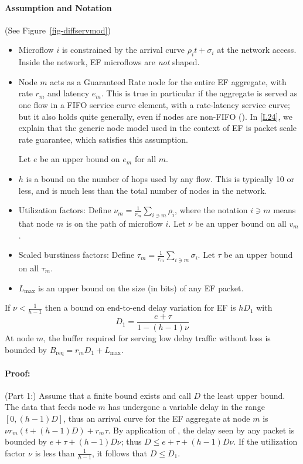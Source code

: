 \paragraph{Assumption and Notation}
(See Figure~\ref{fig-diffservmod})
\begin{itemize}
\item Microflow $i$ is constrained
by the arrival curve $\rho_i t + \sigma_i$ at the network access.
Inside the network, EF microflows are \emph{not} shaped.

\item Node $m$ acts as a Guaranteed Rate node for the entire EF aggregate, with rate $r_m$
and latency $e_m$. This is true in particular if the aggregate is
served as one flow in a FIFO service curve element, with a
rate-latency service curve; but it also holds quite generally,
even if nodes are non-FIFO (). In \cref{L24}, we
explain that the generic node model used in the context of EF is
packet scale rate guarantee, which satisfies this assumption.

Let $e$ be an upper bound on $e_m$ for all $m$.

\item $h$ is a bound on the number of hops used by any flow. This is
typically 10 or less, and is much less than the total number of
nodes in the network.

\item
Utilization factors: Define $\nu_m =\frac{1}{r_m}\sum_{i \ni m}
\rho_i$, where the notation $i\ni m$ means that node $m$ is on the
path of microflow $i$. Let $\nu$ be an upper bound on all $v_m$.


\item Scaled burstiness factors: Define $\tau_m =\frac{1}{r_m}\sum_{i \ni m}
\sigma_i$. Let $\tau$ be an upper bound on all $\tau_m$.

\item $L_{\max}$ is an upper bound on the
size (in bits) of any EF packet.

\end{itemize}
\begin{theorem}
If $\nu < \frac{1}{h-1}$ then a bound on end-to-end delay
variation for EF is $h D_1$ with
$$
D_1 = \frac{e + \tau}{1-(h-1) \nu}
$$
At node $m$, the buffer required for serving low delay traffic
without loss is bounded by $B_{\mbox{req}}=r_m D_1 + L_{\max}$.
\end{theorem}
\paragraph{Proof: }
(Part 1:) Assume that a finite bound exists and call $D$ the least
upper bound. The data that feeds node $m$ has undergone a variable
delay in the range $[0,(h-1)D]$, thus an arrival curve for the EF
aggregate at node $m$ is $\nu r_m (t + (h-1) D)  + r_m \tau $. By
application of , the delay seen by any packet is
bounded by $e + \tau + (h-1) D \nu$; thus $D \leq e + \tau + (h-1)
D \nu$. If the utilization factor $\nu$ is less than
$\frac{1}{h-1}$, it follows that $D \leq D_1$.

